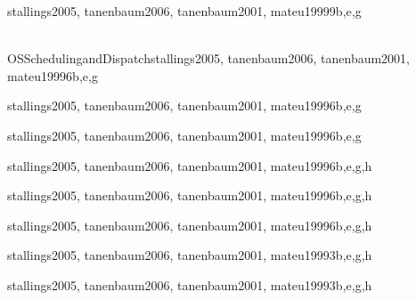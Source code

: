 \begin{syllabus}
\begin{unit}{\OSConcurrency}{}{stallings2005, tanenbaum2006, tanenbaum2001, mateu1999}{9}{b,e,g}
    \OSConcurrencyAllTopics
    \OSConcurrencyAllLearningOutcomes
\end{unit}

\begin{unit}{\\OSSchedulingandDispatch}{}{stallings2005, tanenbaum2006, tanenbaum2001, mateu1999}{6}{b,e,g}
    \OSSchedulingandDispatchAllTopics
    \OSSchedulingandDispatchAllLearningOutcomes
\end{unit}

\begin{unit}{\OSMemoryManagement}{}{stallings2005, tanenbaum2006, tanenbaum2001, mateu1999}{6}{b,e,g}
    \OSMemoryManagementAllTopics
    \OSMemoryManagementAllLearningOutcomes
\end{unit}

\begin{unit}{\OSDeviceManagement}{}{stallings2005, tanenbaum2006, tanenbaum2001, mateu1999}{6}{b,e,g}
    \OSDeviceManagementAllTopics
    \OSDeviceManagementAllLearningOutcomes
\end{unit}

\begin{unit}{\OSSecurityandProtection}{}{stallings2005, tanenbaum2006, tanenbaum2001, mateu1999}{6}{b,e,g,h}
    \OSSecurityandProtectionAllTopics
    \OSSecurityandProtectionAllLearningOutcomes
\end{unit}

\begin{unit}{\OSFileSystems}{}{stallings2005, tanenbaum2006, tanenbaum2001, mateu1999}{6}{b,e,g,h}
    \OSFileSystemsAllTopics
    \OSFileSystemsAllLearningOutcomes
\end{unit}

\begin{unit}{\OSRealTimeandEmbeddedSystems}{}{stallings2005, tanenbaum2006, tanenbaum2001, mateu1999}{6}{b,e,g,h}
    \OSRealTimeandEmbeddedSystemsAllTopics
    \OSRealTimeandEmbeddedSystemsAllLearningOutcomes
\end{unit}

\begin{unit}{\OSFaultTolerance}{}{stallings2005, tanenbaum2006, tanenbaum2001, mateu1999}{3}{b,e,g,h}
    \OSFaultToleranceAllTopics
    \OSFaultToleranceAllLearningOutcomes
\end{unit}

\begin{unit}{\OSSystemPerformanceEvaluation}{}{stallings2005, tanenbaum2006, tanenbaum2001, mateu1999}{3}{b,e,g,h}
        \OSSystemPerformanceEvaluationAllTopics
        \OSSystemPerformanceEvaluationAllLearningOutcomes
    \end{unit}


\begin{coursebibliography}
\end{coursebibliography}

\end{syllabus}

